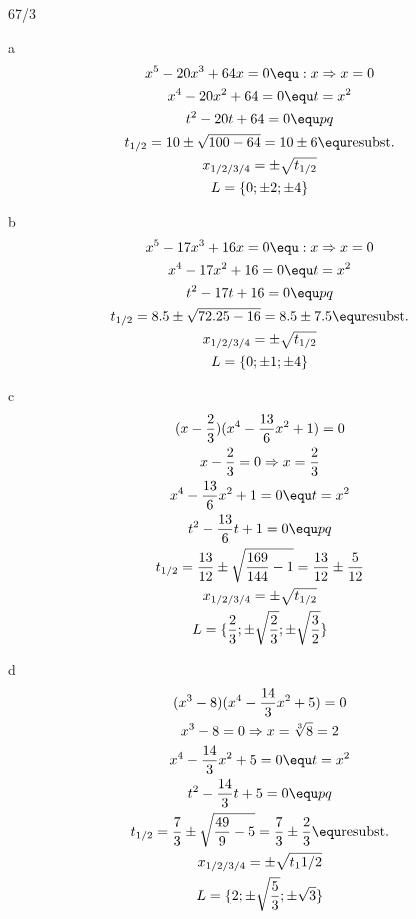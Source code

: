 \begin{exercise}{67/3}
  \item [a]
  \begin{gather*}
    x^5 - 20x^3 + 64x = 0 \equ :x \Rightarrow x = 0 \\
    x^4 - 20x^2 + 64 = 0 \equ t = x^2 \\
    t^2 - 20t + 64 = 0 \equ pq \\
    t_{1/2} = 10 \pm \sqrt{100 - 64} = 10 \pm 6 \equ \text{resubst.} \\
    x_{1/2/3/4} = \pm \sqrt{t_{1/2}} \\
    L = \{0; \pm2; \pm4\}
  \end{gather*}
  \item [b]
  \begin{gather*}
    x^5 - 17x^3 + 16x = 0 \equ :x \Rightarrow x = 0 \\
    x^4 - 17x^2 + 16 = 0 \equ t = x^2 \\
    t^2 - 17t + 16 = 0 \equ pq \\
    t_{1/2} = 8.5 \pm \sqrt{72.25 - 16} = 8.5 \pm 7.5 \equ \text{resubst.} \\
    x_{1/2/3/4} = \pm \sqrt{t_{1/2}} \\
    L = \{0; \pm1; \pm4\}
  \end{gather*}
  \item [c]
  \begin{gather*}
    (x - \frac{2}{3})(x^4 - \frac{13}{6}x^2 + 1) = 0 \\
    x - \frac{2}{3} = 0 \Rightarrow x = \frac{2}{3} \\
    x^4 - \frac{13}{6}x^2 + 1 = 0 \equ t = x^2 \\
    t^2 - \frac{13}{6}t + 1 = 0 \equ pq \\
    t_{1/2} = \frac{13}{12} \pm \sqrt{\frac{169}{144} - 1} = \frac{13}{12} \pm \frac{5}{12} \\
    x_{1/2/3/4} = \pm \sqrt{t_{1/2}} \\
    L = \{\frac{2}{3}; \pm \sqrt{\frac{2}{3}}; \pm \sqrt{\frac{3}{2}}\}
  \end{gather*}
  \item [d]
  \begin{gather*}
    (x^3 - 8)(x^4 - \frac{14}{3}x^2 + 5) = 0 \\
    x^3 - 8 = 0 \Rightarrow x = \sqrt[3]{8} = 2 \\
    x^4 - \frac{14}{3}x^2 + 5 = 0 \equ t = x^2 \\
    t^2 - \frac{14}{3}t + 5 = 0 \equ pq \\
    t_{1/2} = \frac{7}{3} \pm \sqrt{\frac{49}{9} - 5} = \frac{7}{3} \pm \frac{2}{3} \equ \text{resubst.} \\
    x_{1/2/3/4} = \pm \sqrt{t_1{1/2}} \\
    L = \{2; \pm \sqrt{\frac{5}{3}}; \pm \sqrt{3}\}
  \end{gather*}
\end{exercise}
